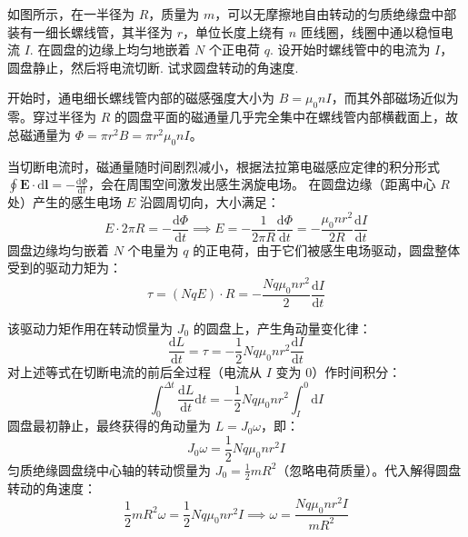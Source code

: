 \begin{exercise}\label{ex:18.8}
如图所示，在一半径为 $R$，质量为 $m$，可以无摩擦地自由转动的匀质绝缘盘中部装有一细长螺线管，其半径为 $r$，单位长度上绕有 $n$ 匝线圈，线圈中通以稳恒电流 $I$. 在圆盘的边缘上均匀地嵌着 $N$ 个正电荷 $q$. 设开始时螺线管中的电流为 $I$，圆盘静止，然后将电流切断. 试求圆盘转动的角速度.
\begin{center}
\end{center}
\end{exercise}
\begin{solution}
开始时，通电细长螺线管内部的磁感强度大小为 $B = \mu_0 n I$，而其外部磁场近似为零。穿过半径为 $R$ 的圆盘平面的磁通量几乎完全集中在螺线管内部横截面上，故总磁通量为 $\Phi = \pi r^2 B = \pi r^2 \mu_0 n I$。

当切断电流时，磁通量随时间剧烈减小，根据法拉第电磁感应定律的积分形式 $\oint \boldsymbol{E} \cdot \mathrm{d}\boldsymbol{l} = -\frac{\mathrm{d}\Phi}{\mathrm{d}t}$，会在周围空间激发出感生涡旋电场。
在圆盘边缘（距离中心 $R$ 处）产生的感生电场 $E$ 沿圆周切向，大小满足：
$$ E \cdot 2\pi R = - \frac{\mathrm{d}\Phi}{\mathrm{d}t} \implies E = - \frac{1}{2\pi R} \frac{\mathrm{d}\Phi}{\mathrm{d}t} = - \frac{\mu_0 n r^2}{2 R} \frac{\mathrm{d}I}{\mathrm{d}t} $$
圆盘边缘均匀嵌着 $N$ 个电量为 $q$ 的正电荷，由于它们被感生电场驱动，圆盘整体受到的驱动力矩为：
$$ \tau = (N q E) \cdot R = - \frac{N q \mu_0 n r^2}{2} \frac{\mathrm{d}I}{\mathrm{d}t} $$

该驱动力矩作用在转动惯量为 $J_0$ 的圆盘上，产生角动量变化律：
$$ \frac{\mathrm{d}L}{\mathrm{d}t} = \tau = - \frac{1}{2} N q \mu_0 n r^2 \frac{\mathrm{d}I}{\mathrm{d}t} $$
对上述等式在切断电流的前后全过程（电流从 $I$ 变为 $0$）作时间积分：
$$ \int_0^{\Delta t} \frac{\mathrm{d}L}{\mathrm{d}t} \mathrm{d}t = - \frac{1}{2} N q \mu_0 n r^2 \int_I^0 \mathrm{d}I $$
圆盘最初静止，最终获得的角动量为 $L = J_0 \omega$，即：
$$ J_0 \omega = \frac{1}{2} N q \mu_0 n r^2 I $$
匀质绝缘圆盘绕中心轴的转动惯量为 $J_0 = \frac{1}{2} m R^2$（忽略电荷质量）。代入解得圆盘转动的角速度：
$$ \frac{1}{2} m R^2 \omega = \frac{1}{2} N q \mu_0 n r^2 I \implies \omega = \frac{N q \mu_0 n r^2 I}{m R^2} $$
\end{solution}
